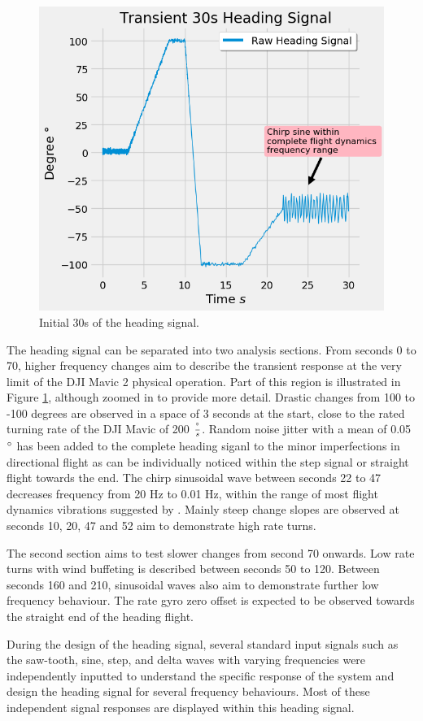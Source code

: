 \begin{figure}[h]
    \centering
    \includegraphics[width=0.75\linewidth]{img/headingSignal30s.png}
    \caption{Initial 30s of the heading signal.}
    \label{fig:transient_heading_signal}
\end{figure}

The heading signal can be separated into two analysis sections. From seconds 0 to 70, higher frequency changes aim to describe the transient response at the very limit of the DJI Mavic 2 physical operation. Part of this region is illustrated in Figure \ref{fig:transient_heading_signal}, although zoomed in to provide more detail. Drastic changes from 100 to -100 degrees are observed in a space of 3 seconds at the start, close to the rated turning rate of the DJI Mavic of 200 $\frac{\degree}{s}$. Random noise jitter with a mean of 0.05 $\degree$ has been added to the complete heading siganl to the minor imperfections in directional flight as can be individually noticed within the step signal or straight flight towards the end. The chirp sinusoidal wave between seconds 22 to 47 decreases frequency from 20 Hz to 0.01 Hz, within the range of most flight dynamics vibrations suggested by \cite{dorobantu2011frequency}. Mainly steep change slopes are observed at seconds 10, 20, 47 and 52 aim to demonstrate high rate turns.

The second section aims to test slower changes from second 70 onwards. Low rate turns with wind buffeting is described between seconds 50 to 120. Between seconds 160 and 210, sinusoidal waves also aim to demonstrate further low frequency behaviour. The rate gyro zero offset is expected to be observed towards the straight end of the heading flight.

During the design of the heading signal, several standard input signals such as the saw-tooth, sine, step, and delta waves with varying frequencies were independently inputted to understand the specific response of the system and design the heading signal for several frequency behaviours. Most of these independent signal responses are displayed within this heading signal.

